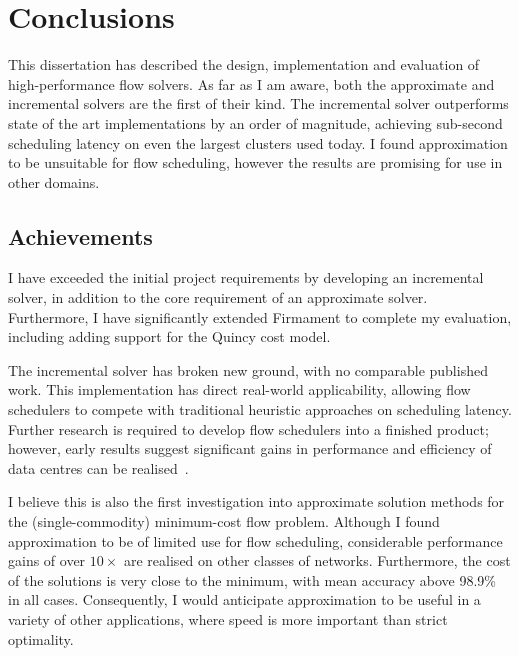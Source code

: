 \chapter{Conclusions}

This dissertation has described the design, implementation and evaluation of high-performance flow solvers. As far as I am aware, both the approximate and incremental solvers are the first of their kind. The incremental solver outperforms state of the art implementations by an order of magnitude, achieving sub-second scheduling latency on even the largest clusters used today. I found approximation to be unsuitable for flow scheduling, however the results are promising for use in other domains.

\section{Achievements}

I have exceeded the initial project requirements by developing an incremental solver, in addition to the core requirement of an approximate solver. Furthermore, I have significantly extended Firmament to complete my evaluation, including adding support for the Quincy cost model.

The incremental solver has broken new ground, with no comparable published work. This implementation has direct real-world applicability, allowing flow schedulers to compete with traditional heuristic approaches on scheduling latency. Further research is required to develop flow schedulers into a finished product; however, early results suggest significant gains in performance and efficiency of data centres can be realised~\cite{Schwarzkopf:2015}.


I believe this is also the first investigation into approximate solution methods for the (single-commodity) minimum-cost flow problem. Although I found approximation to be of limited use for flow scheduling, considerable performance gains of over $10\times$ are realised on other classes of networks. Furthermore, the cost of the solutions is very close to the minimum, with mean accuracy above 98.9\% in all cases. Consequently, I would anticipate approximation to be useful in a variety of other applications, where speed is more important than strict optimality.

